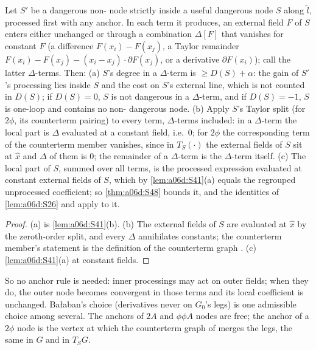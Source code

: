 \begin{lemma}\label{lem:a06d:S42}
Let $S'$ be a dangerous non-\cite[(2.4)]{Ba3} node strictly inside a useful dangerous node $S$ along $\tilde l$, processed first with any anchor. In each term it produces, an external field $F$ of $S$ enters either unchanged or through a combination $\Delta[F]$ that vanishes for constant $F$ (a difference $F(x_i)-F(x_j)$, a Taylor remainder $F(x_i)-F(x_j)-(x_i-x_j)\cdot\partial F(x_j)$, or a derivative $\partial F(x_i)$); call the latter $\Delta$-terms. Then: \textup{(a)} $S$'s degree in a $\Delta$-term is $\ge D(S)+\alpha$: the gain of $S'$'s processing lies inside $S$ and the cost on $S$'s external line, which is not counted in $D(S)$; if $D(S)=0$, $S$ is not dangerous in a $\Delta$-term, and if $D(S)=-1$, $S$ is one-loop and contains no non-\cite[(2.4)]{Ba3} dangerous node. \textup{(b)} Apply $S$'s Taylor split (for $2\phi$, its counterterm pairing) to every term, $\Delta$-terms included: in a $\Delta$-term the local part is $\Delta$ evaluated at a constant field, i.e.\ $0$; for $2\phi$ the corresponding term of the counterterm member vanishes, since in $T_S(\cdot)$ the external fields of $S$ sit at $\hat x$ and $\Delta$ of them is $0$; the remainder of a $\Delta$-term is the $\Delta$-term itself. \textup{(c)} The local part of $S$, summed over all terms, is the processed expression evaluated at constant external fields of $S$, which by \cref{lem:a06d:S41}(a) equals the regrouped unprocessed coefficient; so \cref{thm:a06d:S48} bounds it, and the identities of \cref{lem:a06d:S26} and \cite[(3.30)]{Ba3} apply to it.
\end{lemma}

\begin{proof}
(a) is \cref{lem:a06d:S41}(b). (b) The external fields of $S$ are evaluated at $\hat x$ by the zeroth-order split, and every $\Delta$ annihilates constants; the counterterm member's statement is the definition of the counterterm graph \cite[p.~417]{Ba3}. (c) \cref{lem:a06d:S41}(a) at constant fields.
\end{proof}

So no anchor rule is needed: inner processings may act on outer fields; when they do, the outer node becomes convergent in those terms and its local coefficient is unchanged. Ba{\l}aban's choice (derivatives never on $G_0$'s legs) is one admissible choice among several. The anchors of $2A$ and $\phi\phi A$ nodes are free; the anchor of a $2\phi$ node is the vertex at which the counterterm graph of \cite[p.~417]{Ba3} merges the legs, the same in $G$ and in $T_SG$.

